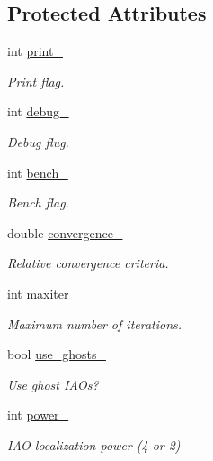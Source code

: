 \subsection*{Protected Attributes}
\begin{DoxyCompactItemize}
\item 
int \mbox{\hyperlink{classforte_1_1_i_a_o_builder_a85cf290b783fe85d3c8897e4b17adaa7}{print\+\_\+}}
\begin{DoxyCompactList}\small\item\em Print flag. \end{DoxyCompactList}\item 
int \mbox{\hyperlink{classforte_1_1_i_a_o_builder_a753655bf29e592331ec5cc914d1ec78c}{debug\+\_\+}}
\begin{DoxyCompactList}\small\item\em Debug flug. \end{DoxyCompactList}\item 
int \mbox{\hyperlink{classforte_1_1_i_a_o_builder_a8e50c3d01241cde4bb813c3304a25c96}{bench\+\_\+}}
\begin{DoxyCompactList}\small\item\em Bench flag. \end{DoxyCompactList}\item 
double \mbox{\hyperlink{classforte_1_1_i_a_o_builder_a6cadd771364ba822bc32f8ed62e164d3}{convergence\+\_\+}}
\begin{DoxyCompactList}\small\item\em Relative convergence criteria. \end{DoxyCompactList}\item 
int \mbox{\hyperlink{classforte_1_1_i_a_o_builder_a962741af42dc7d1cc062059321fd1d22}{maxiter\+\_\+}}
\begin{DoxyCompactList}\small\item\em Maximum number of iterations. \end{DoxyCompactList}\item 
bool \mbox{\hyperlink{classforte_1_1_i_a_o_builder_a665d8f6ef015658c20938cb38e3e5b64}{use\+\_\+ghosts\+\_\+}}
\begin{DoxyCompactList}\small\item\em Use ghost I\+A\+Os? \end{DoxyCompactList}\item 
int \mbox{\hyperlink{classforte_1_1_i_a_o_builder_a9059bff8bf318dfd65e38943487d1a8c}{power\+\_\+}}
\begin{DoxyCompactList}\small\item\em I\+AO localization power (4 or 2) \end{DoxyCompactList}\item 

\end{DoxyCompactItemize}
